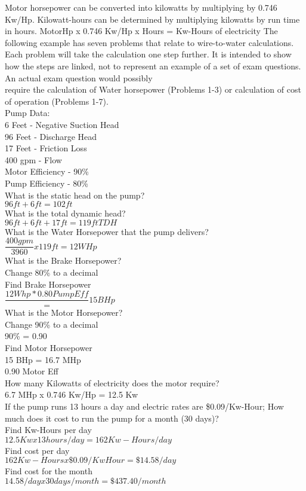 \documentclass{article}
\begin{document}
Motor horsepower can be converted into kilowatts by multiplying by 0.746 Kw/Hp. Kilowatt-hours can be determined by multiplying kilowatts by run time in hours. MotorHp x 0.746 Kw/Hp x Hours = Kw-Hours of electricity The following example has seven problems that relate to wire-to-water calculations. Each problem will take the calculation one step further. It is intended to show how the steps are linked, not to represent an example of a set of exam questions. An actual exam question would possibly\\
require the calculation of Water horsepower (Problems 1-3) or calculation of cost of operation (Problems 1-7).\\
Pump Data:\\
6 Feet - Negative Suction Head\\
96 Feet - Discharge Head\\
17 Feet - Friction Loss\\
400 gpm - Flow\\
Motor Efficiency - 90\%\\
Pump Efficiency - 80\%\\
What is the static head on the pump?\\
$96 ft + 6 ft = 102 ft$\\
What is the total dynamic head?\\
$96 ft + 6 ft + 17 ft = 119 ft TDH$\\
What is the Water Horsepower that the pump delivers?\\
$\dfrac{400 gpm }{3960}x 119 ft = 12 WHp$\\
What is the Brake Horsepower?\\
Change 80\% to a decimal\\
Find Brake Horsepower\\
$\dfrac{12 Whp*0.80 Pump Eff} = 15 BHp$\\
What is the Motor Horsepower?\\
Change 90\% to a decimal\\
90\% = 0.90\\
Find Motor Horsepower\\
15 BHp = 16.7 MHp\\
0.90 Motor Eff\\
How many Kilowatts of electricity does the motor 
require?\\
6.7 MHp x 0.746 Kw/Hp = 12.5 Kw\\
If the pump runs 13 hours a day and electric rates are \$0.09/Kw-Hour; How much does it cost to run the pump for a month (30 days)?\\
Find Kw-Hours per day\\
$12.5 Kw x 13 hours/day = 162 Kw-Hours/day$\\
Find cost per day\\
$162 Kw-Hours x \$0.09/KwHour = \$14.58/day$\\
Find cost for the month\\
$14.58/day x 30 days/month = \$437.40/month$\\
\end{document}
